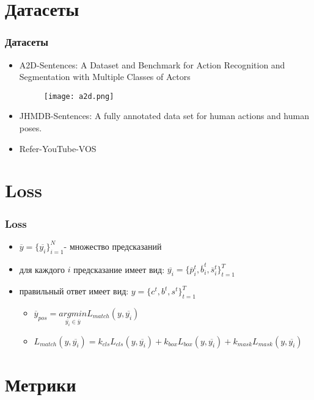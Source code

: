 \section{Датасеты}
\begin{frame}
    \frametitle{Датасеты}
    \begin{itemize}
        \item A2D-Sentences: A Dataset and Benchmark for Action Recognition and Segmentation with Multiple Classes of Actors
        \begin{figure}
            \texttt{[image: a2d.png]}
        \end{figure}
        \item JHMDB-Sentences: A fully annotated data set for human actions and human poses.
        \item Refer-YouTube-VOS
    \end{itemize}
\end{frame}

\section{Loss}
\begin{frame}
    \frametitle{Loss}
    \begin{itemize}
        \item \(\overline{y}=\{\overline{y_i}\}_{i=1}^{N}\)- множество предсказаний
        \item для каждого \(i\)
        предсказание имеет вид: \(\overline{y_i}=\{\overline{p}^t_i,\overline{b}^t_i, \overline{s}^t_i\}_{t=1}^T\)
        \item правильный ответ имеет вид: \(y=\{c^t,b^t,s^t\}_{t=1}^T\) 
        \begin{itemize}
            \item \(\overline{y}_{pos} = \underset{\overline{y_i}\in\overline{y}}{argmin} L_{match}(y, \overline{y_i})\)
            \item \(L_{match}(y, \overline{y_i})=k_{cls}L_{cls}(y, \overline{y_i})+
            k_{box}L_{box}(y, \overline{y_i})+ k_{mask}L_{mask}(y, \overline{y_i})\)
        \end{itemize}
    \end{itemize}
\end{frame}

\section{Метрики}
